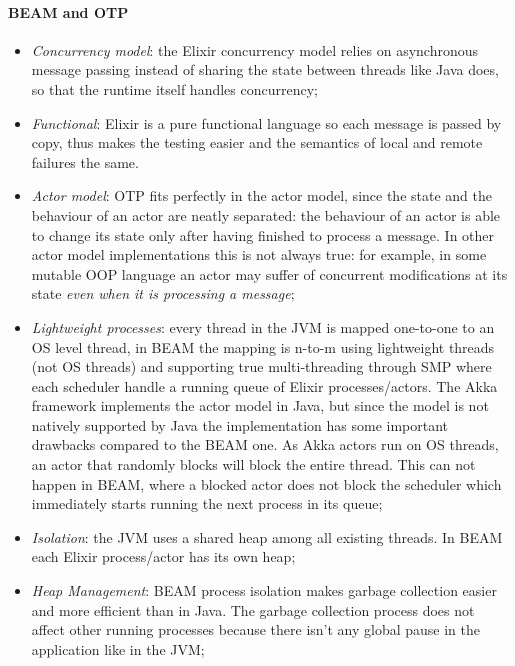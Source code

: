 \paragraph{BEAM and OTP}
\begin{itemize}
  \item \textit{Concurrency model}: the Elixir concurrency model relies on
        asynchronous message passing instead of sharing the state between
        threads like Java does, so that the runtime itself handles concurrency;
  \item \textit{Functional}: Elixir is a pure functional language so each
        message is passed by copy, thus makes the testing easier and the
        semantics of local and remote failures the same.
  \item \textit{Actor model}: OTP fits perfectly in the actor model, since the
        state and the behaviour of an actor are neatly separated: the behaviour
        of an actor is able to change its state only after having finished to
        process a message.
        In other actor model implementations this is not always true: for
        example, in some mutable OOP language an actor may suffer of concurrent
        modifications at its state \textit{even when it is processing a
        message};
  \item \textit{Lightweight processes}: every thread in the JVM is mapped
        one-to-one to an OS level thread, in BEAM the mapping is n-to-m using
        lightweight threads (not OS threads) and supporting true multi-threading
        through SMP where each scheduler handle a running queue of Elixir
        processes/actors. The Akka framework implements the actor model in
        Java, but since the model is not natively supported by Java the
        implementation has some important drawbacks compared to the BEAM one.
        As Akka actors run on OS threads, an actor that randomly blocks will
        block the entire thread. This can not happen in BEAM, where a blocked
        actor does not block the scheduler which immediately starts running the
        next process in its queue;
  \item \textit{Isolation}: the JVM uses a shared heap among all existing
        threads. In BEAM each Elixir process/actor has its own heap;
  \item \textit{Heap Management}: BEAM process isolation makes garbage
        collection easier and more efficient than in Java. The garbage
        collection process does not affect other running processes because
        there isn't any global pause in the application like in the JVM;

\end{itemize}
